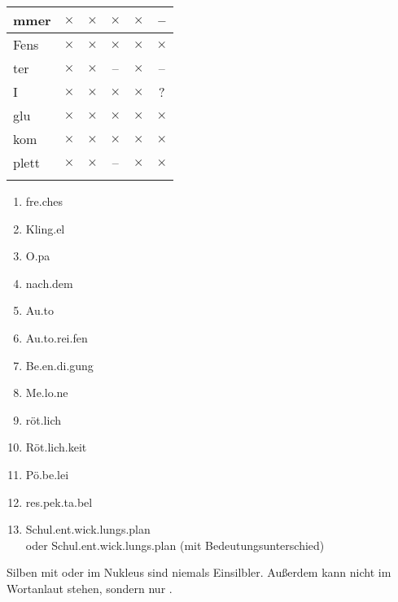 \begin{center}
{\begin{tabular}[h!]{lccccc}
      mmer & $\times$ & $\times$ & $\times$ & $\times$ & -- \\
      \hline
      Fens & $\times$ & $\times$ & $\times$ & $\times$ & $\times$ \\
      ter & $\times$ & $\times$ & -- & $\times$ & -- \\
      \hline
      I & $\times$ & $\times$ & $\times$ & $\times$ & ? \\
      glu & $\times$ & $\times$ & $\times$ & $\times$ & $\times$ \\
      \hline
      kom & $\times$ & $\times$ & $\times$ & $\times$ & $\times$ \\
      plett & $\times$ & $\times$ & -- & $\times$ & $\times$ \\
      \lspbottomrule
    \end{tabular}
  }
\end{center}


\begin{enumerate}\Lf
  \item \Akz fre.ches
  \item \Akz Kling.el
  \item \Akz O.pa
  \item nach.\Akz dem
  \item \Akz Au.to
  \item \Akz Au.to.rei.fen
  \item Be.\Akz en.di.gung
  \item Me.\Akz lo.ne
  \item \Akz röt.lich
  \item \Akz Röt.lich.keit
  \item Pö.be.\Akz lei
  \item res.pek.\Akz ta.bel
  \item \Akz Schul.ent.wick.lungs.plan\\
    oder Schul.ent.\Akz wick.lungs.plan (mit Bedeutungsunterschied)
\end{enumerate}


Silben mit \textipa{[@]} oder \textipa{[5]} im Nukleus sind niemals Einsilbler.
Außerdem kann \textipa{[s]} nicht im Wortanlaut stehen, sondern nur \textipa{[z]}.



